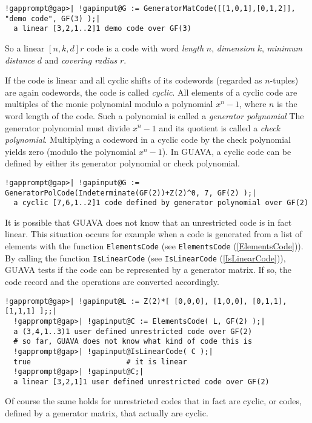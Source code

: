\documentclass[a4paper,11pt]{report}
\begin{document}
{\begin{Verbatim}[commandchars=!@|,fontsize=\small,frame=single,label=Example]
  !gapprompt@gap>| !gapinput@G := GeneratorMatCode([[1,0,1],[0,1,2]], "demo code", GF(3) );|
  a linear [3,2,1..2]1 demo code over GF(3) 
\end{Verbatim}
 So a linear $[n, k, d]r$ code  is a code with word \emph{length} $n$, \emph{dimension} $k$, \emph{minimum distance} $d$ and \emph{covering radius} $r$. 

 If the code is linear and all cyclic shifts of its codewords (regarded as $n$-tuples) are again codewords, the code is called \emph{cyclic}.  All elements of a cyclic code are multiples of the monic polynomial modulo a
polynomial $x^n -1$, where $n$ is the word length of the code. Such a polynomial is called a \emph{generator polynomial}  The generator polynomial must divide $x^n-1$ and its quotient is called a \emph{check polynomial}.  Multiplying a codeword in a cyclic code by the check polynomial yields zero
(modulo the polynomial $x^n -1$). In \textsf{GUAVA}, a cyclic code can be defined by either its generator polynomial or check
polynomial. 
\begin{Verbatim}[commandchars=!@|,fontsize=\small,frame=single,label=Example]
  !gapprompt@gap>| !gapinput@G := GeneratorPolCode(Indeterminate(GF(2))+Z(2)^0, 7, GF(2) );|
  a cyclic [7,6,1..2]1 code defined by generator polynomial over GF(2)
\end{Verbatim}
 It is possible that \textsf{GUAVA} does not know that an unrestricted code is in fact linear. This situation
occurs for example when a code is generated from a list of elements with the
function \texttt{ElementsCode} (see \texttt{ElementsCode} (\ref{ElementsCode})). By calling the function \texttt{IsLinearCode} (see \texttt{IsLinearCode} (\ref{IsLinearCode})), \textsf{GUAVA} tests if the code can be represented by a generator matrix. If so, the code
record and the operations are converted accordingly. 
\begin{Verbatim}[commandchars=!@|,fontsize=\small,frame=single,label=Example]
  !gapprompt@gap>| !gapinput@L := Z(2)*[ [0,0,0], [1,0,0], [0,1,1], [1,1,1] ];;|
  !gapprompt@gap>| !gapinput@C := ElementsCode( L, GF(2) );|
  a (3,4,1..3)1 user defined unrestricted code over GF(2)
  # so far, GUAVA does not know what kind of code this is
  !gapprompt@gap>| !gapinput@IsLinearCode( C );|
  true                      # it is linear
  !gapprompt@gap>| !gapinput@C;|
  a linear [3,2,1]1 user defined unrestricted code over GF(2) 
\end{Verbatim}
  Of course the same holds for unrestricted codes that in fact are cyclic, or
codes, defined by a generator matrix, that actually are cyclic. 

}
\end{document}
